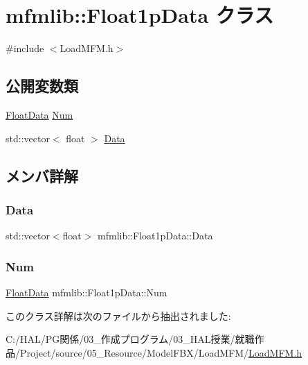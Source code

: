 \hypertarget{classmfmlib_1_1_float1p_data}{}\section{mfmlib\+:\+:Float1p\+Data クラス}
\label{classmfmlib_1_1_float1p_data}


{\ttfamily \#include $<$Load\+M\+F\+M.\+h$>$}

\subsection*{公開変数類}
\begin{DoxyCompactItemize}
\item 
\mbox{\hyperlink{classmfmlib_1_1_float_data}{Float\+Data}} \mbox{\hyperlink{classmfmlib_1_1_float1p_data_a6672d2c3f3e05965772b92524f27db15}{Num}}
\item 
std\+::vector$<$ float $>$ \mbox{\hyperlink{classmfmlib_1_1_float1p_data_adb6b956878dc0346e374bb89f74c10fd}{Data}}
\end{DoxyCompactItemize}


\subsection{メンバ詳解}
\mbox{\label{classmfmlib_1_1_float1p_data_adb6b956878dc0346e374bb89f74c10fd}} 
\subsubsection{\texorpdfstring{Data}{Data}}
{\footnotesize\ttfamily std\+::vector$<$float$>$ mfmlib\+::\+Float1p\+Data\+::\+Data}

\mbox{\label{classmfmlib_1_1_float1p_data_a6672d2c3f3e05965772b92524f27db15}} 
\subsubsection{\texorpdfstring{Num}{Num}}
{\footnotesize\ttfamily \mbox{\hyperlink{classmfmlib_1_1_float_data}{Float\+Data}} mfmlib\+::\+Float1p\+Data\+::\+Num}



このクラス詳解は次のファイルから抽出されました\+:\begin{DoxyCompactItemize}
\item 
C\+:/\+H\+A\+L/\+P\+G関係/03\+\_\+作成プログラム/03\+\_\+\+H\+A\+L授業/就職作品/\+Project/source/05\+\_\+\+Resource/\+Model\+F\+B\+X/\+Load\+M\+F\+M/\mbox{\hyperlink{_load_m_f_m_8h}{Load\+M\+F\+M.\+h}}\end{DoxyCompactItemize}
